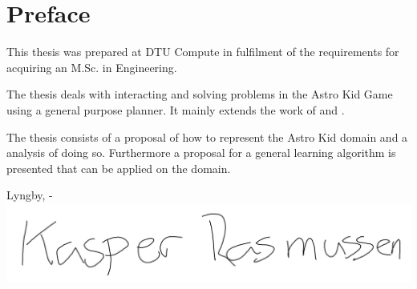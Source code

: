 \chapter{Preface}

This thesis was prepared at DTU Compute in fulfilment of the requirements for acquiring an M.Sc. in Engineering.

The thesis deals with interacting and solving problems in the Astro Kid Game using a general purpose planner. It mainly extends the work of \cite{Action-Schemas} and \cite{jacobsen2015a}.

The thesis consists of a proposal of how to represent the Astro Kid domain  and a analysis of doing so. Furthermore a proposal for a general learning algorithm is presented that can be applied on the domain.
\vspace{20mm}
\begin{center}
    \hspace{20mm} Lyngby, \thesishandin-\thesisyear
    \vspace{5mm}
    \newline
    \includegraphics[scale=0.18]{figures/Signature}
\end{center}
\begin{flushright}
    \thesisauthor
\end{flushright}
